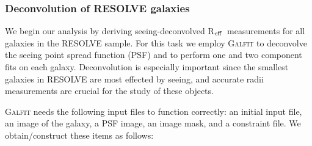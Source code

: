 \documentclass[iop,apj]{emulateapj}
\newcommand{\Reff}{R$_{\rm eff}$}
\begin{document}
\subsubsection{Deconvolution of RESOLVE galaxies}
\label{deconv}

\noindent We begin our analysis by deriving seeing-deconvolved \Reff\ measurements for all galaxies in the RESOLVE sample. For this task we employ \textsc{Galfit} \citep{Peng2002} to deconvolve the seeing point spread function (PSF) and to perform one and two component fits on each galaxy. Deconvolution is especially important since the smallest galaxies in RESOLVE are most effected by seeing, and accurate radii measurements are crucial for the study of these objects. 

\textsc{Galfit} needs the following input files to function correctly: an initial input file, an image of the galaxy, a PSF image, an image mask, and a constraint file. We obtain/construct these items as follows:
\end{document}

